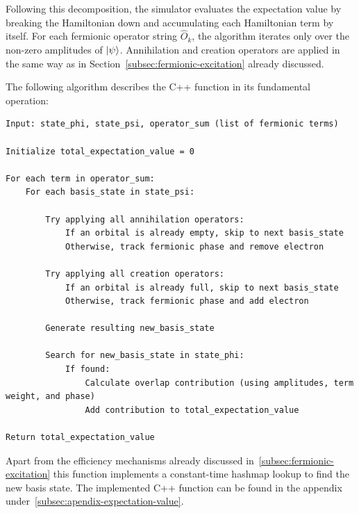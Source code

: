 Following this decomposition, the simulator evaluates the expectation value by breaking the Hamiltonian down and accumulating each Hamiltonian term by itself.
For each fermionic operator string $\hat{O}_k$, the algorithm iterates only over the non-zero amplitudes of $\ket{\psi}$.
Annihilation and creation operators are applied in the same way as in Section~\ref{subsec:fermionic-excitation} already discussed.

The following algorithm describes the C++ function in its fundamental operation:
\begin{verbatim}
Input: state_phi, state_psi, operator_sum (list of fermionic terms)

Initialize total_expectation_value = 0

For each term in operator_sum:
    For each basis_state in state_psi:

        Try applying all annihilation operators:
            If an orbital is already empty, skip to next basis_state
            Otherwise, track fermionic phase and remove electron

        Try applying all creation operators:
            If an orbital is already full, skip to next basis_state
            Otherwise, track fermionic phase and add electron

        Generate resulting new_basis_state

        Search for new_basis_state in state_phi:
            If found:
                Calculate overlap contribution (using amplitudes, term weight, and phase)
                Add contribution to total_expectation_value

Return total_expectation_value
\end{verbatim}

Apart from the efficiency mechanisms already discussed in~\ref{subsec:fermionic-excitation} this function implements a constant-time hashmap lookup to find the new basis state.
The implemented C++ function can be found in the appendix under~\ref{subsec:apendix-expectation-value}.